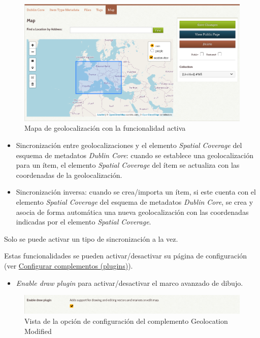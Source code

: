 \documentclass[
]{article}
\providecommand{\tightlist}{%
  \setlength{\itemsep}{0pt}\setlength{\parskip}{0pt}}
\begin{document}
\begin{figure}
\hypertarget{geolocation-1}{%
\centering
\includegraphics{../_static/images/geolocation-1.png}
\caption{Mapa de geolocalización con la funcionalidad
activa}\label{geolocation-1}
}
\end{figure}

\begin{itemize}
\tightlist
\item
  Sincronización entre geolocalizaciones y el elemento \emph{Spatial
  Coverage} del esquema de metadatos \emph{Dublin Core}: cuando se
  establece una geolocalización para un ítem, el elemento \emph{Spatial
  Coverage} del ítem se actualiza con las coordenadas de la
  geolocalización.
\item
  Sincronización inversa: cuando se crea/importa un ítem, si este cuenta
  con el elemento \emph{Spatial Coverage} del esquema de metadatos
  \emph{Dublin Core}, se crea y asocia de forma automática una nueva
  geolocalización con las coordenadas indicadas por el elemento
  \emph{Spatial Coverage}.
\end{itemize}

Solo se puede activar un tipo de sincronización a la vez.

Estas funcionalidades se pueden activar/desactivar su página de
configuración (ver
\protect\hyperlink{configurar-complementos-plugins}{Configurar
complementos (plugins)}).

\begin{itemize}
\tightlist
\item
  \emph{Enable draw plugin} para activar/desactivar el marco avanzado de
  dibujo.
\end{itemize}

\begin{figure}
\hypertarget{geolocation-2}{%
\centering
\includegraphics{../_static/images/geolocation-2.png}
\caption{Vista de la opción de configuración del complemento Geolocation
Modified}\label{geolocation-2}
}
\end{figure}
\end{document}
